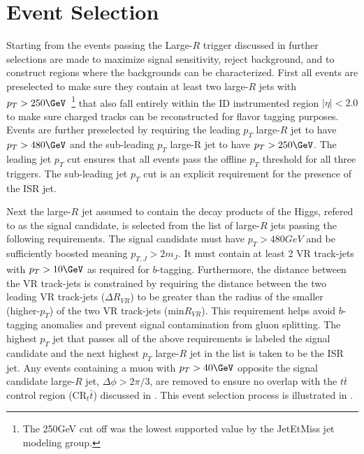 \section{Event Selection} \label{sec:selection:event_selection}

Starting from the events passing the Large-$R$ trigger discussed in
 further selections are made to maximize signal
sensitivity, reject background, and to construct regions where the backgrounds
can be characterized.  First all events are preselected to make sure they
contain at least two large-$R$ jets with $p_{T} > 250\GeV$~\footnote{The 250GeV
cut off was the lowest supported value by the JetEtMiss jet modeling group.}
that also fall entirely within the ID instrumented region $|\eta| < 2.0$ to
make sure charged tracks can be reconstructed for flavor tagging purposes.
Events are further preselected by requiring the leading $p_{T}$ large-$R$ jet
to have $p_{T} > 480\GeV$ and the sub-leading $p_{T}$ large-R jet to have
$p_{T} > 250\GeV$. The leading jet $p_{T}$ cut ensures that all events pass the
offline $p_{T}$ threshold for all three triggers.  The sub-leading jet $p_{T}$
cut is an explicit requirement for the presence of the ISR jet. 

Next the large-$R$ jet assumed to contain the decay products of the Higgs,
refered to as the signal candidate, is selected from the list of large-$R$ jets
passing the following requirements.  The signal candidate must have $p_{T} >
480GeV$ and be sufficiently boosted meaning $p_{T,J} > 2m_{J}$.  It must
contain at least 2 VR track-jets with $p_{T} > 10\GeV$ as required for
$b$-tagging. Furthermore, the distance between the VR track-jets is constrained
by requiring the distance between the two leading VR track-jets ($\Delta
R_{VR}$) to be greater than the radius of the smaller (higher-$p_{T}$) of the
two VR track-jets (min$R_{VR}$).  This requirement helps avoid $b$-tagging
anomalies and prevent signal contamination from gluon splitting.  The highest
$p_{T}$ jet that passes all of the above requirements is labeled the signal
candidate and the next highest $p_{T}$ large-$R$ jet in the list is taken to be
the ISR jet.  Any events containing a muon with $p_{T} > 40\GeV$ opposite the
signal candidate large-$R$ jet, $\Delta \phi > 2\pi/3$, are removed to ensure
no overlap with the $t\bar{t}$ control region ($\text{CR}_t\bar{t}$) discussed
in .  This event selection process is illustrated in
.

